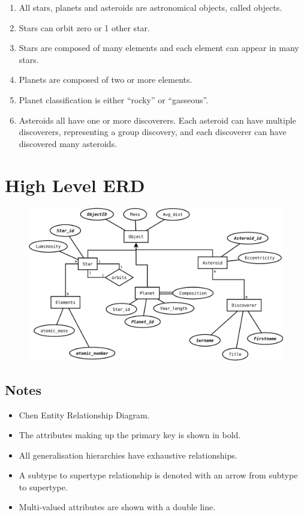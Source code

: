 \documentclass[11pt]{article} %
\begin{document}
\begin{enumerate}
	\item All stars, planets and asteroids are astronomical objects, called
		objects.
	\item Stars can orbit zero or 1 other star.
	\item Stars are composed of many elements and each element can appear in
		many stars.
	\item Planets are composed of two or more elements.
	\item Planet classification is either ``rocky'' or ``gasseous''.
	\item Asteroids all have one or more discoverers. Each asteroid can have
		multiple discoverers, representing a group discovery, and each
		discoverer can have discovered many asteroids.
\end{enumerate}


\newpage
\section{High Level ERD}
\label{sec:high_level_erd}

\begin{figure}[h!]
	\centering
	\includegraphics[width=1.0\textwidth]{ERD-high.pdf}
\end{figure}

\subsection{Notes}
\label{sub:notes}

\begin{itemize}
	\item Chen Entity Relationship Diagram.
	\item The attributes making up the primary key is shown in bold.
	\item All generalisation hierarchies have exhaustive relationships.
	\item A subtype to supertype relationship is denoted with an arrow from
		subtype to supertype.
	\item Multi-valued attributes are shown with a double line.
\end{itemize}
\end{document}
